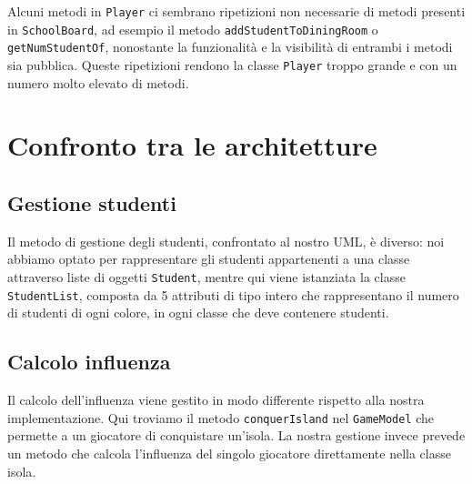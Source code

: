 \documentclass[12pt]{article}
\begin{document}
Alcuni metodi in \texttt{Player} ci sembrano ripetizioni non necessarie di metodi presenti in \texttt{SchoolBoard}, ad esempio il metodo \texttt{addStudentToDiningRoom} o \texttt{getNumStudentOf}, nonostante la funzionalità e la visibilità di entrambi i metodi sia pubblica. Queste ripetizioni rendono la classe \texttt{Player} troppo grande e con un numero molto elevato di metodi.

\section{Confronto tra le architetture}
\subsection{Gestione studenti}
Il metodo di gestione degli studenti, confrontato al nostro UML, è diverso: noi abbiamo optato per rappresentare gli studenti appartenenti a una classe attraverso liste di oggetti \texttt{Student}, mentre qui viene istanziata la classe \texttt{StudentList}, composta da 5 attributi di tipo intero che rappresentano il numero di studenti di ogni colore, in ogni classe che deve contenere studenti.

\subsection{Calcolo influenza}
Il calcolo dell'influenza viene gestito in modo differente rispetto alla nostra implementazione. Qui troviamo il metodo \texttt{conquerIsland} nel \texttt{GameModel} che permette a un giocatore di conquistare un'isola. La nostra gestione invece prevede un metodo che calcola l'influenza del singolo giocatore direttamente nella classe isola.
\end{document}
